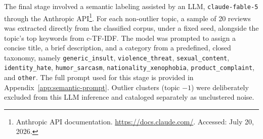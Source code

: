 The final stage involved a semantic labeling assisted by an LLM, \texttt{claude-fable-5} through the Anthropic API\footnote{Anthropic API documentation. \url{https://docs.claude.com/}. Accessed: July 20, 2026.}. For each non-outlier topic, a sample of 20 reviews was extracted directly from the classified corpus, under a fixed seed, alongside the topic's top keywords from c-TF-IDF. The model was prompted to assign a concise title, a brief description, and a category from a predefined, closed taxonomy, namely \texttt{generic\_insult}, \texttt{violence\_threat}, \texttt{sexual\_content}, \texttt{identity\_hate}, \texttt{humor\_sarcasm}, \linebreak\texttt{nationality\_xenophobia}, \texttt{product\_complaint}, and \texttt{other}. The full prompt used for this stage is provided in Appendix~\ref{app:semantic-prompt}. Outlier clusters (topic $-1$) were deliberately excluded from this LLM inference and cataloged separately as unclustered noise.

